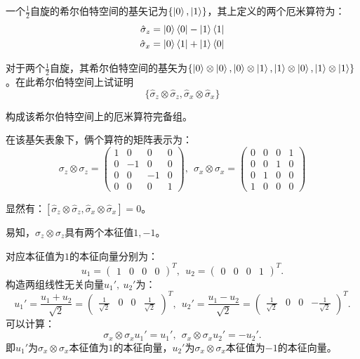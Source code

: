 \documentclass[reqno,a4paper,12pt]{amsart}
\begin{document}
一个$\frac{1}{2}$自旋的希尔伯特空间的基矢记为$\{\ket{0},\ket{1}\}$，其上定义的两个厄米算符为：
\begin{align*}
	\hat{\sigma}_z = \ket{0}\bra{0} - \ket{1}\bra{1} \\
	\hat{\sigma}_x = \ket{0}\bra{1} + \ket{1}\bra{0}
\end{align*}

对于两个$\frac{1}{2}$自旋，其希尔伯特空间的基矢为$\{\ket{0}\otimes\ket{0}, \ket{0}\otimes\ket{1}, \ket{1}\otimes\ket{0}, \ket{1}\otimes\ket{1}\}$。在此希尔伯特空间上试证明
\[
	\{ \hat{\sigma}_z\otimes\hat{\sigma}_z, \hat{\sigma}_x\otimes\hat{\sigma}_x \}
\]

构成该希尔伯特空间上的厄米算符完备组。
\begin{tcolorbox}[breakable, colback = black!5!white, colframe = black]
在该基矢表象下，俩个算符的矩阵表示为：
\[
	\sigma_z\otimes\sigma_z = 
	\left(
	\begin{matrix}
		1 & 0 & 0 & 0 \\
		0 & -1 & 0 & 0 \\
		0 & 0 & -1 & 0 \\
		0 & 0 & 0 & 1
	\end{matrix}
	\right), ~~
	\sigma_x\otimes\sigma_x = 
	\left(
	\begin{matrix}
		0 & 0 & 0 & 1 \\
		0 & 0 & 1 & 0 \\
		0 & 1 & 0 & 0 \\
		1 & 0 & 0 & 0
	\end{matrix}
	\right)
\]

显然有：$[\hat{\sigma}_z\otimes\hat{\sigma}_z, \hat{\sigma}_x\otimes\hat{\sigma}_x] = 0$。

易知，$\sigma_z\otimes\sigma_z$具有两个本征值$1,-1$。

对应本征值为$1$的本征向量分别为：
\[
	u_1 = (\begin{matrix}
		1 & 0 & 0 & 0
	\end{matrix})^T, ~~
	u_2 = (\begin{matrix}
		0 & 0 & 0 & 1
	\end{matrix})^T.
\]
构造两组线性无关向量$u_1', ~u_2'$为：
\[
	u_1' = \frac{u_1+u_2}{\sqrt{2}} = (\begin{matrix}
		\frac{1}{\sqrt{2}} & 0 & 0 & \frac{1}{\sqrt{2}}
	\end{matrix})^T, ~~
	u_2' = \frac{u_1-u_2}{\sqrt{2}} = (\begin{matrix}
		\frac{1}{\sqrt{2}} & 0 & 0 & -\frac{1}{\sqrt{2}}
	\end{matrix})^T.
\]
可以计算：
\[
	\sigma_x\otimes\sigma_x u_1' = u_1', ~~ \sigma_x\otimes\sigma_x u_2' = -u_2'.
\]
即$u_1'$为$\sigma_x\otimes\sigma_x$本征值为$1$的本征向量，$u_2'$为$\sigma_x\otimes\sigma_x$本征值为$-1$的本征向量。


\end{tcolorbox}
\end{document}

